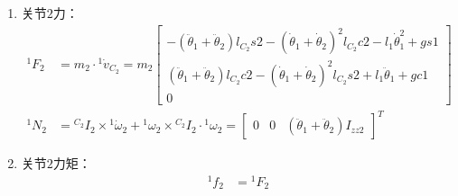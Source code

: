 \documentclass[
12pt, %
a4paper, 
oneside, %
headinclude,footinclude, %
]{scrartcl}
\begin{document}
{\begin{enumerate}
\begin{align*}
{}^1 \dot{\omega}_2 &= {}^1 \dot{\omega}_1 + \ddot{\theta}_2 \cdot {}^1 Z_2 = \begin{bmatrix} 0 & 0 & \ddot{\theta}_1  + \ddot{\theta}_2 \end{bmatrix}^T \\
{}^1 \dot{v}_2 &= {}^1 \dot{v}_1 + {}^1 \dot{\omega}_1 \times {}^1 P_2 + {}^1 \omega_1 \times ({}^1 \omega_1 \times {}^1 P_2) = \begin{bmatrix} - l_1 \dot{\theta}_1^2 + gs1 & l_1 \ddot{\theta}_1 + gc1 & 0 \end{bmatrix}^T \\
{}^1 P_{C_2} &= \begin{bmatrix} l_{C_2}c2 & l_{C_2}s2 & 0\end{bmatrix}^T \\
{}^1 \dot{v}_{C_2} &= {}^1 \dot{v}_2 + {}^1 \dot{\omega}_2 \times {}^1 P_{C_2} + {}^1 \omega_2 \times ({}^1 \omega_2 \times {}^1 P_{C_2}) \\
&= \begin{bmatrix} -(\ddot{\theta}_1 + \ddot{\theta}_2)l_{C_2}s2 - (\dot{\theta}_1 + \dot{\theta}_2)^2 l_{C_2}c2 - l_1 \dot{\theta}_1^2 + gs1 \\ (\ddot{\theta}_1 + \ddot{\theta}_2)l_{C_2}c2 - (\dot{\theta}_1 + \dot{\theta}_2)^2 l_{C_2}s2 + l_1 \ddot{\theta}_1 + gc1 \\ 0 \end{bmatrix}
\end{align*}
\item 关节$ 2 $力：
\begin{align*}
{}^1 F_2 &= m_2 \cdot {}^1 \dot{v}_{C_2} = m_2 \begin{bmatrix} -(\ddot{\theta}_1 + \ddot{\theta}_2)l_{C_2}s2 - (\dot{\theta}_1 + \dot{\theta}_2)^2 l_{C_2}c2 - l_1 \dot{\theta}_1^2 + gs1 \\ (\ddot{\theta}_1 + \ddot{\theta}_2)l_{C_2}c2 - (\dot{\theta}_1 + \dot{\theta}_2)^2 l_{C_2}s2 + l_1 \ddot{\theta}_1 + gc1 \\ 0 \end{bmatrix} \\
{}^1 N_2 &= {}^{C_2}I_2 \times {}^1 \dot{\omega}_2 + {}^1 \omega_2 \times {}^{C_2}I_2 \cdot {}^1 \omega_2 = \begin{bmatrix} 0 & 0 & (\ddot{\theta}_1 + \ddot{\theta}_2) I_{zz2} \end{bmatrix}^T
\end{align*}
\item 关节$ 2 $力矩：
\begin{align*}
{}^1 f_2 &= {}^1 F_2 \\

\end{align*}
\end{enumerate}}
\end{document}
